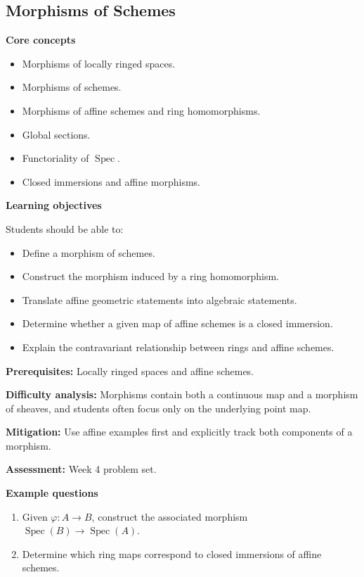 \documentclass[11pt]{article}
\begin{document}
\subsection{Morphisms of Schemes}

\textbf{Core concepts}
\begin{itemize}
    \item Morphisms of locally ringed spaces.
    \item Morphisms of schemes.
    \item Morphisms of affine schemes and ring homomorphisms.
    \item Global sections.
    \item Functoriality of $\operatorname{Spec}$.
    \item Closed immersions and affine morphisms.
\end{itemize}

\textbf{Learning objectives}

Students should be able to:
\begin{itemize}
    \item Define a morphism of schemes.
    \item Construct the morphism induced by a ring homomorphism.
    \item Translate affine geometric statements into algebraic statements.
    \item Determine whether a given map of affine schemes is a closed immersion.
    \item Explain the contravariant relationship between rings and affine schemes.
\end{itemize}

\textbf{Prerequisites:} Locally ringed spaces and affine schemes.

\textbf{Difficulty analysis:} Morphisms contain both a continuous map and a morphism of sheaves, and students often focus only on the underlying point map.

\textbf{Mitigation:} Use affine examples first and explicitly track both components of a morphism.

\textbf{Assessment:} Week 4 problem set.

\textbf{Example questions}
\begin{enumerate}
    \item Given $\varphi:A\to B$, construct the associated morphism $\operatorname{Spec}(B)\to\operatorname{Spec}(A)$.
    \item Determine which ring maps correspond to closed immersions of affine schemes.
\end{enumerate}
\end{document}
